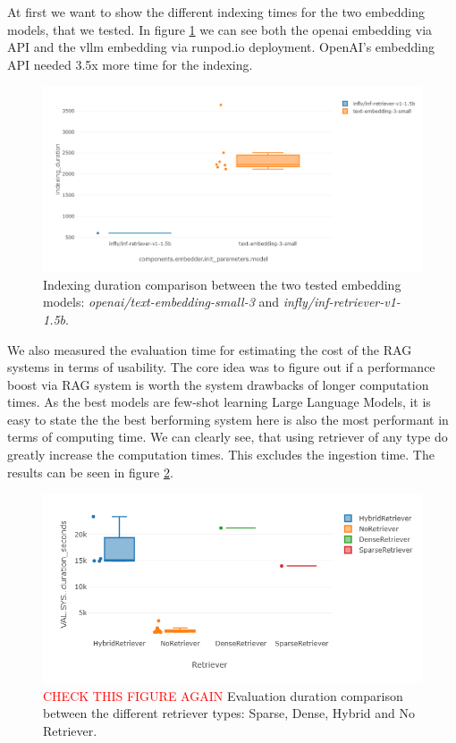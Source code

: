 At first we want to show the different indexing times for the two embedding models, that we tested. In figure \ref{fig:indexing-time} we can see both the openai embedding via API and the vllm embedding via runpod.io deployment. OpenAI's embedding API needed 3.5x more time for the indexing.

\begin{figure}[!ht]
    \centering
    \includegraphics[width=\textwidth]{images/indexing-time.png}
    \caption{Indexing duration comparison between the two tested embedding models: \textit{openai/text-embedding-small-3} and \textit{infly/inf-retriever-v1-1.5b}.}
    \label{fig:indexing-time}
\end{figure}

We also measured the evaluation time for estimating the cost of the RAG systems in terms of usability. The core idea was to figure out if a performance boost via RAG system is worth the system drawbacks of longer computation times. As the best models are few-shot learning Large Language Models, it is easy to state the the best berforming system here is also the most performant in terms of computing time. We can clearly see, that using retriever of any type do greatly increase the computation times. This excludes the ingestion time. The results can be seen in figure \ref{fig:evaluation-time}.

\begin{figure}[!ht]
    \centering
    \includegraphics[width=\textwidth]{images/duration-retriever.png}
    \caption{\textcolor{red}{CHECK THIS FIGURE AGAIN} Evaluation duration comparison between the different retriever types: Sparse, Dense, Hybrid and No Retriever.}
    \label{fig:evaluation-time}
\end{figure}

